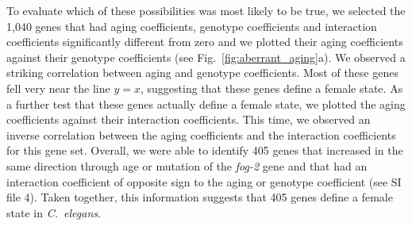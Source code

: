 \documentclass[10pt,letterpaper,twocolumn]{article}
\newcommand{\cel}{\emph{C.~elegans}}
\newcommand{\fog}{\emph{\mbox{fog-2}}}
\newcommand{\intersectn}{1,040}
\newcommand{\femalen}{405}
\begin{document}
To evaluate which of these possibilities was most likely to be true, we selected the \intersectn{} genes that had aging coefficients, genotype coefficients and interaction coefficients significantly different from zero and we plotted their aging coefficients against their genotype coefficients (see Fig.~\ref{fig:aberrant_aging}a). We observed a striking correlation between aging and genotype coefficients. Most of these genes fell very near the line $y=x$, suggesting that these genes define a female state. As a further test that these genes actually define a female state, we plotted the aging coefficients against their interaction coefficients.
This time, we observed an inverse correlation between the aging coefficients and the interaction coefficients for this gene set. Overall, we were able to identify \femalen{} genes that increased in the same direction through age or mutation of the \fog{} gene and that had an interaction coefficient of opposite sign to the aging or genotype coefficient (see SI file 4). Taken together, this information suggests that \femalen{} genes define a female state in \cel{}.
\end{document}
